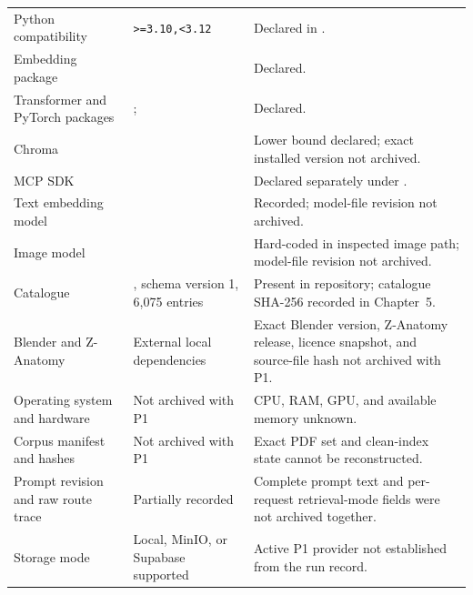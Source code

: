 \begin{longtable}{L{0.30\textwidth}L{0.32\textwidth}L{0.28\textwidth}}
Python compatibility & \texttt{>=3.10,<3.12} & Declared in . \\
Embedding package &  & Declared. \\
Transformer and PyTorch packages & ;  & Declared. \\
Chroma &  & Lower bound declared; exact installed version not archived. \\
MCP SDK &  & Declared separately under . \\
Text embedding model &  & Recorded; model-file revision not archived. \\
Image model &  & Hard-coded in inspected image path; model-file revision not archived. \\
Catalogue & , schema version 1, 6,075 entries & Present in repository; catalogue SHA-256 recorded in Chapter~5. \\
Blender and Z-Anatomy & External local dependencies & Exact Blender version, Z-Anatomy release, licence snapshot, and source-file hash not archived with P1. \\
Operating system and hardware & Not archived with P1 & CPU, RAM, GPU, and available memory unknown. \\
Corpus manifest and hashes & Not archived with P1 & Exact PDF set and clean-index state cannot be reconstructed. \\
Prompt revision and raw route trace & Partially recorded & Complete prompt text and per-request retrieval-mode fields were not archived together. \\
Storage mode & Local, MinIO, or Supabase supported & Active P1 provider not established from the run record. \\
\bottomrule
\end{longtable}
